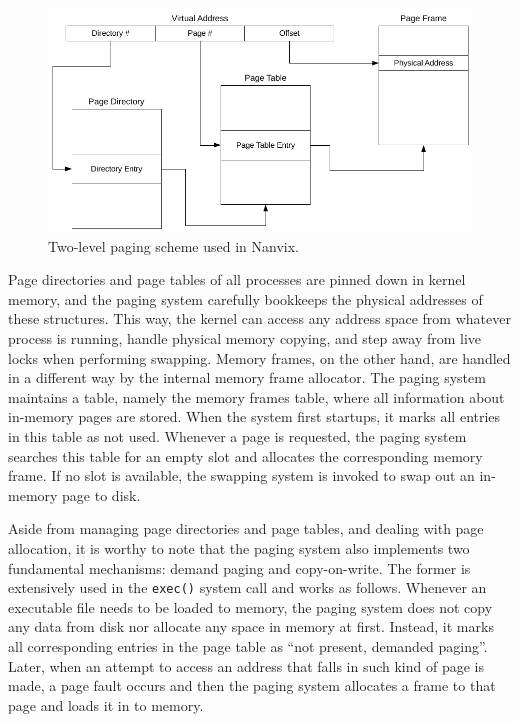 \documentclass[10pt,a4paper]{article}
\begin{document}
\begin{figure}
	\centering
	\includegraphics[scale=0.85]{img/paging-scheme}
	\caption{Two-level paging scheme used in Nanvix.}
	\label{figure: paging scheme}
\end{figure}

Page directories and page tables of all processes are pinned down in kernel memory, and the paging system carefully bookkeeps the physical addresses of these structures. This way, the kernel can access any address space from whatever process is running, handle physical memory copying, and step away from live locks when performing swapping. Memory frames, on the other hand, are handled in a different way by the internal memory frame allocator. The paging system maintains a table, namely the memory frames table, where all information about in-memory pages are stored. When the system first startups, it marks all entries in this table as not used. Whenever a page is requested, the paging system searches this table for an empty slot and allocates the corresponding memory frame. If no slot is available, the swapping system is invoked to swap out an in-memory page to disk.

Aside from managing page directories and page tables, and dealing with page allocation, it is worthy to note that the paging system also implements two fundamental mechanisms: demand paging and copy-on-write. The former is extensively used in the \texttt{exec()} system call and works as follows. Whenever an executable file needs to be loaded to memory, the paging system does not copy any data from disk nor allocate any space in memory at first. Instead, it marks all corresponding entries in the page table as ``not present, demanded paging''. Later, when an attempt to access an address that falls in such kind of page is made, a page fault occurs and then the paging system allocates a frame to that page and loads it in to memory. 
\end{document}
